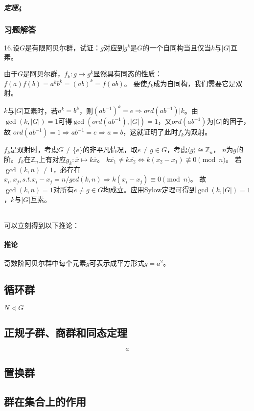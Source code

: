 \documentclass{article}
\begin{document}
\subparagraph{定理4} 

\subsubsection*{习题解答}
16.设$G$是有限阿贝尔群，试证：$g$对应到$g^k$是$G$的一个自同构当且仅当$k$与$|G|$互素。

由于$G$是阿贝尔群，$f_k: g \mapsto g^k$显然具有同态的性质：$f(a)f(b)=a^kb^k=(ab)^k=f(ab)$。
要使$f_k$成为自同构，我们需要它是双射。

$k$与$|G|$互素时，若$a^k=b^k$，则$(ab^{-1})^k=e \Rightarrow ord(ab^{-1}) | k$。由
$\gcd(k,|G|)=1$可得$\gcd(ord(ab^{-1}), |G|)=1$，又$ord(ab^{-1})$为$|G|$的因子，故
$ord(ab^{-1})=1 \Rightarrow ab^{-1}=e \Rightarrow a=b$，这就证明了此时$f_k$为双射。

$f_k$是双射时，考虑$G \neq \{e\}$的非平凡情况，取$e \neq g \in G$，考虑$\langle g \rangle \cong \mathbb{Z}_n$，
$n$为$g$的阶。$f_k$在$\mathbb{Z}_n$上有对应$g_k:\overline{x} \mapsto k\overline{x}$。
$k\overline{x_1} \neq k\overline{x_2} \Leftrightarrow k(x_2-x_1) \not\equiv 0 \pmod{n}$。
若$\gcd(k,n) \neq 1$，必存在$x_i,x_j, s.t. x_i-x_j=n/gcd(k,n) \Rightarrow k(x_i-x_j) \equiv 0 \pmod{n}$。
故$\gcd(k,n)=1$对所有$e \neq g \in G$均成立。应用Sylow定理可得到$\gcd(k,|G|)=1$，$k$与$|G|$互素。

~\\
可以立刻得到以下推论：
\paragraph{推论} 奇数阶阿贝尔群中每个元素$g$可表示成平方形式$g=a^2$。

\subsection{循环群}

$N\lhd G$

\subsection{正规子群、商群和同态定理}

$$a$$

\subsection{置换群}

\subsection{群在集合上的作用}
\end{document}
